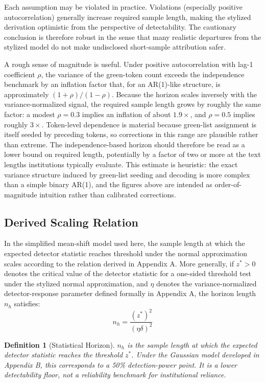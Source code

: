 \documentclass[11pt]{article}
\newtheorem{definition}{Definition}
\begin{document}
Each assumption may be violated in practice. Violations (especially positive
autocorrelation) generally increase required sample length, making the stylized
derivation optimistic from the perspective of detectability. The cautionary
conclusion is therefore robust in the sense that many realistic departures from
the stylized model do not make undisclosed short-sample attribution safer.

A rough sense of magnitude is useful. Under positive autocorrelation with lag-1
coefficient $\rho$, the variance of the green-token count exceeds the independence
benchmark by an inflation factor that, for an AR(1)-like structure, is
approximately $(1+\rho)/(1-\rho)$. Because the horizon scales inversely with the
variance-normalized signal, the required sample length grows by roughly the same
factor: a modest $\rho = 0.3$ implies an inflation of about $1.9\times$, and
$\rho = 0.5$ implies roughly $3\times$. Token-level dependence is material because
green-list assignment is itself seeded by preceding tokens, so corrections in this
range are plausible rather than extreme. The independence-based horizon should
therefore be read as a lower bound on required length, potentially by a factor of
two or more at the text lengths institutions typically evaluate. This estimate is
heuristic: the exact variance structure induced by green-list seeding and decoding
is more complex than a simple binary AR(1), and the figures above are intended as
order-of-magnitude intuition rather than calibrated corrections.

\subsection{Derived Scaling Relation}

In the simplified mean-shift model used here, the sample length at which the
expected detector statistic reaches threshold under the normal approximation scales
according to the relation derived in Appendix A. More generally, if $z^* > 0$
denotes the critical value of the detector statistic for a one-sided threshold test
under the stylized normal approximation, and $\eta$
denotes the variance-normalized detector-response parameter defined formally in
Appendix A, the horizon length $n_h$ satisfies:
\begin{equation}
n_h = \frac{(z^*)^2}{(\eta\delta)^2}
\end{equation}

\begin{definition}[Statistical Horizon]
$n_h$ is the sample length at which the expected detector statistic reaches the
threshold $z^*$. Under the Gaussian model developed in Appendix B, this
corresponds to a 50\% detection-power point. It is a lower detectability floor, not
a reliability benchmark for institutional reliance.
\end{definition}
\end{document}
